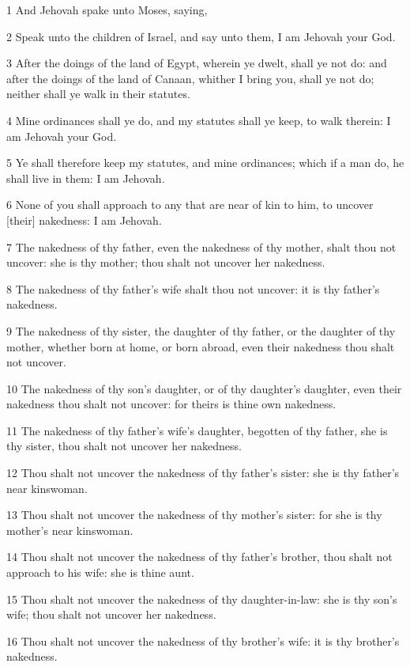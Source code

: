 \par 1 And Jehovah spake unto Moses, saying,
\par 2 Speak unto the children of Israel, and say unto them, I am Jehovah your God.
\par 3 After the doings of the land of Egypt, wherein ye dwelt, shall ye not do: and after the doings of the land of Canaan, whither I bring you, shall ye not do; neither shall ye walk in their statutes.
\par 4 Mine ordinances shall ye do, and my statutes shall ye keep, to walk therein: I am Jehovah your God.
\par 5 Ye shall therefore keep my statutes, and mine ordinances; which if a man do, he shall live in them: I am Jehovah.
\par 6 None of you shall approach to any that are near of kin to him, to uncover [their] nakedness: I am Jehovah.
\par 7 The nakedness of thy father, even the nakedness of thy mother, shalt thou not uncover: she is thy mother; thou shalt not uncover her nakedness.
\par 8 The nakedness of thy father's wife shalt thou not uncover: it is thy father's nakedness.
\par 9 The nakedness of thy sister, the daughter of thy father, or the daughter of thy mother, whether born at home, or born abroad, even their nakedness thou shalt not uncover.
\par 10 The nakedness of thy son's daughter, or of thy daughter's daughter, even their nakedness thou shalt not uncover: for theirs is thine own nakedness.
\par 11 The nakedness of thy father's wife's daughter, begotten of thy father, she is thy sister, thou shalt not uncover her nakedness.
\par 12 Thou shalt not uncover the nakedness of thy father's sister: she is thy father's near kinswoman.
\par 13 Thou shalt not uncover the nakedness of thy mother's sister: for she is thy mother's near kinswoman.
\par 14 Thou shalt not uncover the nakedness of thy father's brother, thou shalt not approach to his wife: she is thine aunt.
\par 15 Thou shalt not uncover the nakedness of thy daughter-in-law: she is thy son's wife; thou shalt not uncover her nakedness.
\par 16 Thou shalt not uncover the nakedness of thy brother's wife: it is thy brother's nakedness.

